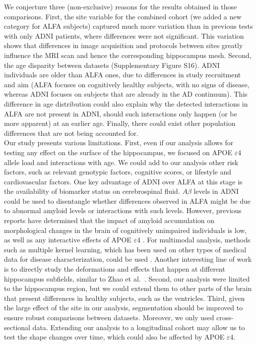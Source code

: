 We conjecture three (non-exclusive) reasons for the results obtained in those comparisons. First, the site variable for the combined cohort (we added a new category for ALFA subjects) captured much more variation than in previous tests with only ADNI patients, where differences were not significant. This variation shows that differences in image acquisition and protocols between sites greatly influence the MRI scan and hence the corresponding hippocampus mesh. Second, the age disparity between datasets (Supplementary Figure S16). ADNI individuals are older than ALFA ones, due to differences in study recruitment and aim (ALFA focuses on cognitively healthy subjects, with no signs of disease, whereas ADNI focuses on subjects that are already in the AD continuum). This difference in age distribution could also explain why the detected interactions in ALFA are not present in ADNI, should such interactions only happen (or be more apparent) at an earlier age. Finally, there could exist other population differences that are not being accounted for. \\

Our study presents various limitations. First, even if our analysis allows for testing any effect on the surface of the hippocampus, we focused on APOE $\varepsilon$4 allele load and interactions with age. We could add to our analysis other risk factors, such as relevant genotypic factors, cognitive scores, or lifestyle and cardiovascular factors. One key advantage of ADNI over ALFA at this stage is the availability of biomarker status on cerebrospinal fluid. $A\beta$ levels in ADNI could be used to disentangle whether differences observed in ALFA might be due to abnormal amyloid levels or interactions with such levels. However, previous reports have determined that the impact of amyloid accumulation on morphological changes in the brain of cognitively unimpaired individuals is low, as well as any interactive effects of APOE $\varepsilon$4 \cite{Liu2015c,Lim2017}. For multimodal analysis, methods such as multiple kernel learning, which has been used on other types of medical data for disease characterization, could be used \cite{Sanchez-Martinez2017,Marti-Juan2019}. Another interesting line of work is to directly study the deformations and effects that happen at different hippocampus subfields, similar to Zhao et al.\ \cite{Zhao2019}. Second, our analysis were limited to the hippocampus region, but we could extend them to other parts of the brain that present differences in healthy subjects, such as the ventricles. Third, given the large effect of the site in our analysis, segmentation should be improved to ensure robust comparisons between datasets. Moreover, we only used cross-sectional data. Extending our analysis to a longitudinal cohort may allow us to test the shape changes over time, which could also be affected by APOE $\varepsilon$4. \\

